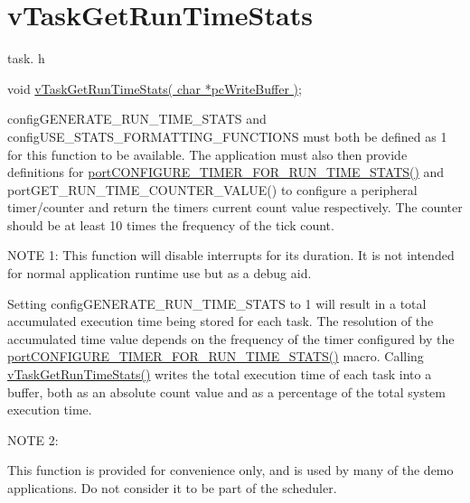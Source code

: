 \hypertarget{group__vTaskGetRunTimeStats}{\section{v\-Task\-Get\-Run\-Time\-Stats}
\label{group__vTaskGetRunTimeStats}
}
task. h 
\begin{DoxyPre}void \hyperlink{task_8h_a52da9b427041a48dc9f6802e10f151d4}{vTaskGetRunTimeStats( char *pcWriteBuffer )};\end{DoxyPre}


config\-G\-E\-N\-E\-R\-A\-T\-E\-\_\-\-R\-U\-N\-\_\-\-T\-I\-M\-E\-\_\-\-S\-T\-A\-T\-S and config\-U\-S\-E\-\_\-\-S\-T\-A\-T\-S\-\_\-\-F\-O\-R\-M\-A\-T\-T\-I\-N\-G\-\_\-\-F\-U\-N\-C\-T\-I\-O\-N\-S must both be defined as 1 for this function to be available. The application must also then provide definitions for \hyperlink{FreeRTOS_8h_a727939bcdb98501e0eba0ec8a1841e1b}{port\-C\-O\-N\-F\-I\-G\-U\-R\-E\-\_\-\-T\-I\-M\-E\-R\-\_\-\-F\-O\-R\-\_\-\-R\-U\-N\-\_\-\-T\-I\-M\-E\-\_\-\-S\-T\-A\-T\-S()} and port\-G\-E\-T\-\_\-\-R\-U\-N\-\_\-\-T\-I\-M\-E\-\_\-\-C\-O\-U\-N\-T\-E\-R\-\_\-\-V\-A\-L\-U\-E() to configure a peripheral timer/counter and return the timers current count value respectively. The counter should be at least 10 times the frequency of the tick count.

N\-O\-T\-E 1\-: This function will disable interrupts for its duration. It is not intended for normal application runtime use but as a debug aid.

Setting config\-G\-E\-N\-E\-R\-A\-T\-E\-\_\-\-R\-U\-N\-\_\-\-T\-I\-M\-E\-\_\-\-S\-T\-A\-T\-S to 1 will result in a total accumulated execution time being stored for each task. The resolution of the accumulated time value depends on the frequency of the timer configured by the \hyperlink{FreeRTOS_8h_a727939bcdb98501e0eba0ec8a1841e1b}{port\-C\-O\-N\-F\-I\-G\-U\-R\-E\-\_\-\-T\-I\-M\-E\-R\-\_\-\-F\-O\-R\-\_\-\-R\-U\-N\-\_\-\-T\-I\-M\-E\-\_\-\-S\-T\-A\-T\-S()} macro. Calling \hyperlink{task_8h_a52da9b427041a48dc9f6802e10f151d4}{v\-Task\-Get\-Run\-Time\-Stats()} writes the total execution time of each task into a buffer, both as an absolute count value and as a percentage of the total system execution time.

N\-O\-T\-E 2\-:

This function is provided for convenience only, and is used by many of the demo applications. Do not consider it to be part of the scheduler.

